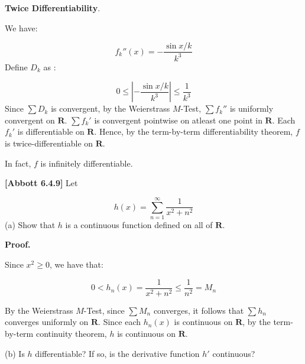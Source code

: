 \documentclass[10pt]{article}
\begin{document}
\textbf{Twice Differentiability}.



We have:


\begin{equation*}
f_{k} ''( x) =-\frac{\sin x/k}{k^{3}}
\end{equation*}
Define $\displaystyle D_{k}$ as :


\begin{equation*}
0\leq \left| -\frac{\sin x/k}{k^{3}}\right| \leq \frac{1}{k^{3}}
\end{equation*}
Since $\displaystyle \sum D_{k}$ is convergent, by the Weierstrass $\displaystyle M$-Test, $\displaystyle \sum f_{k} ''$ is uniformly convergent on $\displaystyle \mathbf{R}$. $\displaystyle \sum f_{k} '$ is convergent pointwise on atleast one point in $\displaystyle \mathbf{R}$. Each $\displaystyle f_{k} '$ is differentiable on $\displaystyle \mathbf{R}$. Hence, by the term-by-term differentiability theorem, $\displaystyle f$ is twice-differentiable on $\displaystyle \mathbf{R}$.



In fact, $\displaystyle f$ is infinitely differentiable.



\textbf{[Abbott 6.4.9]} Let


\begin{equation*}
h( x) =\sum _{n=1}^{\infty }\frac{1}{x^{2} +n^{2}}
\end{equation*}
(a) Show that $\displaystyle h$ is a continuous function defined on all of $\displaystyle \mathbf{R}$.



\textbf{Proof.}



Since $\displaystyle x^{2} \geq 0$, we have that:


\begin{equation*}
0< h_{n}( x) =\frac{1}{x^{2} +n^{2}} \leq \frac{1}{n^{2}} =M_{n}
\end{equation*}


By the Weierstrass $\displaystyle M$-Test, since $\displaystyle \sum M_{n}$ converges, it follows that $\displaystyle \sum h_{n}$ converges uniformly on $\displaystyle \mathbf{R}$. Since each $\displaystyle h_{n}( x)$ is continuous on $\displaystyle \mathbf{R}$, by the term-by-term continuity theorem, $\displaystyle h$ is continuous on $\displaystyle \mathbf{R}$.



(b) Is $\displaystyle h$ differentiable? If so, is the derivative function $\displaystyle h'$ continuous?
\end{document}
